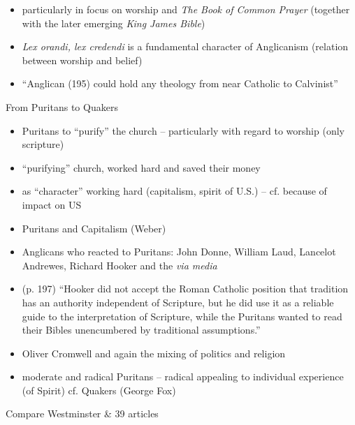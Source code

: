\begin{frame}[label=sec-3-4]{}
\begin{itemize}
\item particularly in focus on worship and \emph{The Book of Common Prayer} (together with the later emerging \emph{King James Bible})
\item \emph{Lex orandi, lex credendi} is a fundamental character of Anglicanism (relation between worship and belief)

\item ``Anglican (195) could hold any theology from near Catholic to Calvinist''
\end{itemize}
\end{frame}
\begin{frame}[label=sec-3-5]{From Puritans to Quakers}
\begin{itemize}
\item Puritans to ``purify'' the church -- particularly with regard to worship (only scripture)
\item ``purifying'' church, worked hard and saved their money
\item as ``character'' working hard (capitalism, spirit of U.S.) -- cf. because of impact on US
\item Puritans and Capitalism (Weber)
\end{itemize}
\end{frame}

\begin{frame}[label=sec-3-6]{}
\begin{itemize}
\item Anglicans who reacted to Puritans: John Donne, William Laud, Lancelot Andrewes, \alert{Richard Hooker} and the \emph{via media}
\item (p. 197) ``Hooker did not accept the Roman Catholic position that tradition has an authority independent of Scripture, but he did use it as a reliable guide to the interpretation of Scripture, while the Puritans wanted to read their Bibles unencumbered by traditional assumptions.''
\item Oliver Cromwell and again the mixing of politics and religion

\item moderate and radical Puritans -- radical appealing to individual experience (of Spirit) cf. Quakers (George Fox)
\end{itemize}
\end{frame}
\begin{frame}[label=sec-3-7]{Compare Westminster \& 39 articles}
\end{frame}

